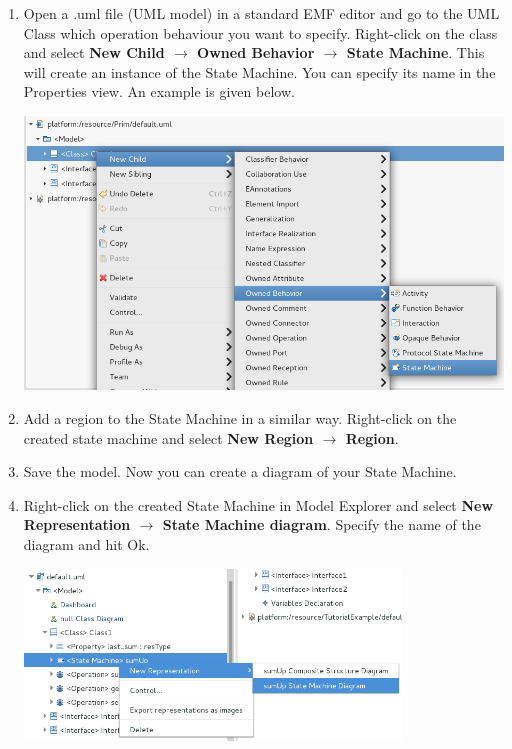 \documentclass[12pt]{article}
\begin{document}
\begin{enumerate}
\item
Open a .uml file (UML model) in a standard EMF editor and go to the UML Class which operation behaviour you want to specify. Right-click on the class and select \textbf{New Child $\rightarrow$ Owned Behavior $\rightarrow$ State Machine}. This will create an instance of the State Machine. You can specify its name in the Properties view. An example is given below.

     \centerline{
     \includegraphics[width=14cm]{draws/sm-creation.png}
     \label{fig:vce-proj}
     }

\item 
Add a region to the State Machine in a similar way. Right-click on the created state machine and select \textbf{New Region $\rightarrow$ Region}.
\item
Save the model. Now you can create a diagram of your State Machine.
\item
Right-click on the created State Machine in Model Explorer and select \textbf{New Representation $\rightarrow$ State Machine diagram}. Specify the name of the diagram and hit Ok.

     \centerline{
     \includegraphics[width=10cm]{draws/sm-diagr.png}
     \label{fig:vce-proj}
     }
\end{enumerate}
\end{document}
